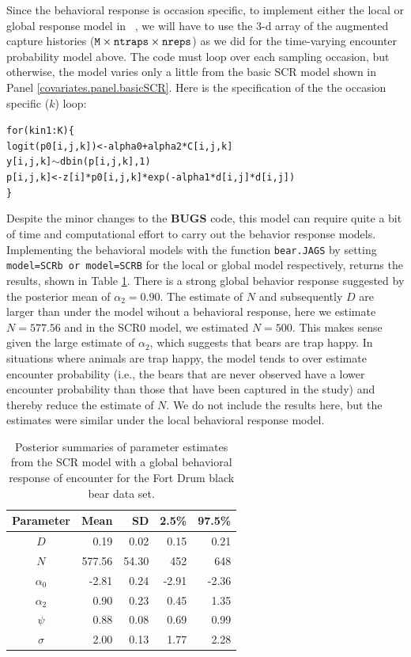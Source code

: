 Since the behavioral response is occasion specific, to implement either the local or global 
response model in \jags~, we will have to use the 3-d array of the augmented
capture histories ($\mbox{\tt M} \times \mbox{\tt ntraps} \times
\mbox{\tt nreps}$) as we did for the time-varying encounter probability
model above. The code must loop over each sampling occasion, but otherwise, the model
varies only a little from the basic SCR model shown in Panel \ref{covariates.panel.basicSCR}.  
Here is the specification of the the occasion specific ($k$) loop:
{\small
\begin{alltt}
for(k in 1:K)\{
  logit(p0[i,j,k]) <- alpha0 + alpha2*C[i,j,k]
  y[i,j,k] \(\sim\) dbin(p[i,j,k],1)
  p[i,j,k] <- z[i]*p0[i,j,k]*exp(- alpha1*d[i,j]*d[i,j])
\}
\end{alltt}
}

Despite the minor changes to the {\bf BUGS} code, this model can
require quite a bit of time and computational effort to carry out the
behavior response models.  Implementing the behavioral models with the
function {\tt bear.JAGS} by setting {\tt model=SCRb or model=SCRB} for
the local or global model respectively, returns the results, shown in
Table \ref{covariates.tab.SCRb}.  There is a strong global behavior
response suggested by the posterior mean of $\alpha_2 = 0.90$.  The
estimate of $N$ and subsequently $D$ are larger than under the model
wihout a behavioral response, here we estimate $N = 577.56$ and in the
SCR0 model, we estimated $N = 500$.  This makes sense given the large
estimate of $\alpha_2$, which suggests that bears are trap happy.  In
situations where animals are trap happy, the model tends to over
estimate encounter probability (i.e., the bears that are never
observed have a lower encounter probability than those that have been
captured in the study) and thereby reduce the estimate of $N$.  We do
not include the results here, but the estimates were similar under the
local behavioral response model.

\begin{table}[ht]
\centering
\caption{Posterior summaries of parameter estimates from the SCR model with a 
global behavioral response of encounter for the Fort Drum black bear data set.}
\begin{tabular}{crrrr}
\hline \hline
Parameter & Mean & SD & 2.5\% & 97.5\% \\
\hline
$D$           &    0.19     &  0.02    & 0.15 & 0.21 \\
$N$           &   577.56 &  54.30  & 452  & 648  \\
$\alpha_0$  &    -2.81     & 0.24    & -2.91  & -2.36  \\
$\alpha_2$  & 0.90  &  0.23   & 0.45  &  1.35 \\
$\psi$  &   0.88 &  0.08  &  0.69 & 0.99  \\
$\sigma$ & 2.00 &  0.13  &   1.77 & 2.28  \\ \hline
\end{tabular}
\label{covariates.tab.SCRb}
\end{table}



